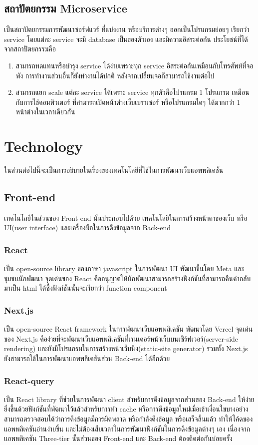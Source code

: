 \subsection{สถาปัตยกรรม Microservice}
เป็นสถาปัตยกรรมการพัฒนาซอร์ฟแวร์ ที่แบ่งงาน หรือบริการต่างๆ ออกเป็นโปรแกรมย่อยๆ
เรียกว่า service โดยแต่ละ service จะมี database เป็นของตัวเอง และมีความอิสระต่อกัน 
ประโยชน์ที่ได้จากสถาปัตยกรรมคือ 
\begin{enumerate}
      \item สามารถทดแทนหรือบำรุง service ได้ง่ายเพราะทุก service อิสระต่อกันเหมือนกับโทรศัพท์ที่จอพัง 
      การทำงานส่วนอื่นก็ยังทำงานได้ปกติ หลังจากเปลี่ยนจอก็สามารถใช้งานต่อไป
      \item สามารถแยก scale แต่ละ service ได้เพราะ service ทุกตัวคือโปรแกรม 1 โปรแกรม เหมือนกับการใช้คอมพิวเตอร์
      ที่สามารถเปิดหน้าต่างเว็บเบราเซอร์ หรือโปรแกรมใดๆ ได้มากกว่า 1 หน้าต่างในเวลาเดียวกัน
\end{enumerate}

\section{Technology}
ในส่วนต่อไปนี้จะเป็นการอธิบายในเรื่องของเทคโนโลยีที่ใช้ในการพัฒนาเว็บแอพพลิเคชัน
\subsection{Front-end}
เทคโนโลยีในส่วนของ Front-end นั้นประกอบไปด้วย
เทคโนโลยีในการสร้างหน้าตาของเว็บ หรือ UI(user interface)
และเครื่องมือในการดึงข้อมูลจาก Back-end
\subsubsection{React}
เป็น open-source library ของภาษา javascript ในการพัฒนา UI พัฒนาขึ้นโดย Meta และชุมชนนักพัฒนา
จุดเด่นของ React คืออนุญาตให้นักพัฒนาสามารถสร้างฟังก์ชันที่สามารถคืนค่ากลับมาเป็น html ได้ซึ่งฟังก์ชันนั้นจะเรียกว่า function component
\subsubsection{Next.js}
เป็น open-source React framework ในการพัฒนาเว็บแอพพลิเคชัน พัฒนาโดย Vercel
จุดเด่นของ Next.js คือง่ายที่จะพัฒนาเว็บแอพพลิเคชันที่เรนเดอร์หน้าเว็บบนเซิร์ฟเวอร์(server-side rendering) และยังมีโปรแกรมในการสร้างหน้าเว็บนิ่ง(static-site generator)
รวมทั้ง Next.js ยังสามารถใช้ในการพัฒนาแอพพลิเคชันส่วน Back-end ได้อีกด้วย
\subsubsection{React-query}
เป็น React library ที่ช่วยในการพัฒนา client สำหรับการดึงข้อมูลจากส่วนของ Back-end ให้ง่ายยิ่งขึ้นด้วยฟังก์ชันที่พัฒนาไว้แล้วสำหรับการทำ cache 
หรือการดึงข้อมูลใหม่เมื่อเข้าเงื่อนใขบางอย่าง สามารถตรวจสอบได้ว่าการดึงข้อมูลมีการผิดพลาด หรือกำลังดึงข้อมูล หรือเสร็จสิ้นแล้ว ทำให้โค้ดของแอพพลิเคชันอ่านง่ายขึ้น 
และไม่ต้องเสียเวลาในการพัฒนาฟังก์ชันในการดึงข้อมูลต่างๆ เอง เนื่องจากแอพพลิเคชัน Three-tier นั้นส่วนของ Front-end และ Back-end ต้องติดต่อกันบ่อยครั้ง
